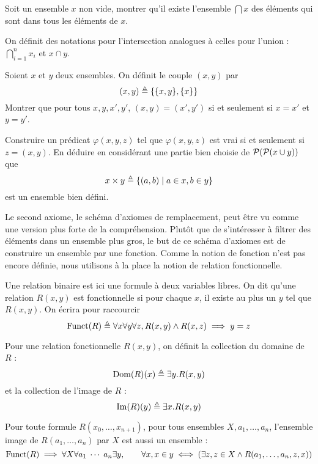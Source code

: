 \begin{exercise}
  Soit un ensemble $x$ non vide, montrer qu'il existe l'ensemble $\bigcap x$ des
  éléments qui sont dans tous les éléments de $x$.
\end{exercise}

\begin{notation}
  On définit des notations pour l'intersection analogues à celles pour l'union :
  $\displaystyle\bigcap_{i = 1}^n x_i$ et $x \cap y$.
\end{notation}

\begin{exercise}\label{exo.ZF.prod}
  Soient $x$ et $y$ deux ensembles. On définit le couple $(x,y)$ par
  \[(x,y) \triangleq \{\{x,y\},\{x\}\}\]
  Montrer que pour tous $x,y,x',y'$, $(x,y) = (x',y')$ si et seulement si
  $x=x'$ et $y=y'$.

  Construire un prédicat $\varphi(x,y,z)$ tel que $\varphi(x,y,z)$ est vrai
  si et seulement si $z = (x,y)$. En déduire en considérant une partie bien
  choisie de $\mathcal{P} (\mathcal{P}(x\cup y))$ que
  \[x\times y \triangleq \{(a,b)\mid a \in x, b \in y\}\]
  est un ensemble bien défini.
\end{exercise}

Le second axiome, le schéma d'axiomes de remplacement, peut être vu comme une
version plus forte de la compréhension. Plutôt que de s'intéresser à filtrer des
éléments dans un ensemble plus gros, le but de ce schéma d'axiomes est de
construire un ensemble par une fonction. Comme la notion de fonction n'est pas
encore définie, nous utilisons à la place la notion de relation fonctionnelle.

\begin{definition}
  Une relation binaire est ici une formule à deux variables libres. On dit
  qu'une relation $R(x,y)$ est fonctionnelle si pour chaque $x$, il existe au
  plus un $y$ tel que $R(x,y)$. On écrira pour raccourcir
  \[\operatorname{Funct}(R) \triangleq \forall x\forall y\forall z, R(x,y)\land R(x,z)\implies
  y = z\]

  Pour une relation fonctionnelle $R(x,y)$, on définit la collection du domaine
  de $R$ :
  \[\operatorname{Dom}(R)(x)\triangleq \exists y. R(x,y)\]
  et la collection de l'image de $R$ :
  \[\operatorname{Im}(R)(y)\triangleq \exists x. R(x,y)\]
\end{definition}

\begin{axiom}\label{ax.ZF.repl}
  Pour toute formule $R(x_0,\ldots,x_{n+1})$, pour tous ensembles
  $X,a_1,\ldots,a_n$, l'ensemble image de $R(a_1,\ldots,a_n)$ par $X$ est aussi
  un ensemble :
  \[\operatorname{Funct}(R)\implies \forall X \forall a_1\;\cdots\;a_n\exists y,\qquad
  \forall x, x \in y \iff (\exists z, z\in X \land R(a_1,\ldots,a_n,z,x))\]
\end{axiom}

